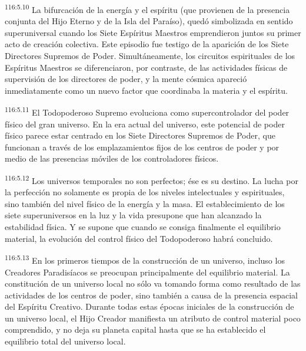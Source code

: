 \par
\textsuperscript{116:5.10} La bifurcación de la energía y el espíritu (que provienen de la presencia conjunta del Hijo Eterno y de la Isla del Paraíso), quedó simbolizada en sentido superuniversal cuando los Siete Espíritus Maestros emprendieron juntos su primer acto de creación colectiva. Este episodio fue testigo de la aparición de los Siete Directores Supremos de Poder. Simultáneamente, los circuitos espirituales de los Espíritus Maestros se diferenciaron, por contraste, de las actividades físicas de supervisión de los directores de poder, y la mente cósmica apareció inmediatamente como un nuevo factor que coordinaba la materia y el espíritu.

\par
\textsuperscript{116:5.11} El Todopoderoso Supremo evoluciona como supercontrolador del poder físico del gran universo. En la era actual del universo, este potencial de poder físico parece estar centrado en los Siete Directores Supremos de Poder, que funcionan a través de los emplazamientos fijos de los centros de poder y por medio de las presencias móviles de los controladores físicos.

\par
\textsuperscript{116:5.12} Los universos temporales no son perfectos; ése es su destino. La lucha por la perfección no solamente es propia de los niveles intelectuales y espirituales, sino también del nivel físico de la energía y la masa. El establecimiento de los siete superuniversos en la luz y la vida presupone que han alcanzado la estabilidad física. Y se supone que cuando se consiga finalmente el equilibrio material, la evolución del control físico del Todopoderoso habrá concluido.

\par
\textsuperscript{116:5.13} En los primeros tiempos de la construcción de un universo, incluso los Creadores Paradisíacos se preocupan principalmente del equilibrio material. La constitución de un universo local no sólo va tomando forma como resultado de las actividades de los centros de poder, sino también a causa de la presencia espacial del Espíritu Creativo. Durante todas estas épocas iniciales de la construcción de un universo local, el Hijo Creador manifiesta un atributo de control material poco comprendido, y no deja su planeta capital hasta que se ha establecido el equilibrio total del universo local.

